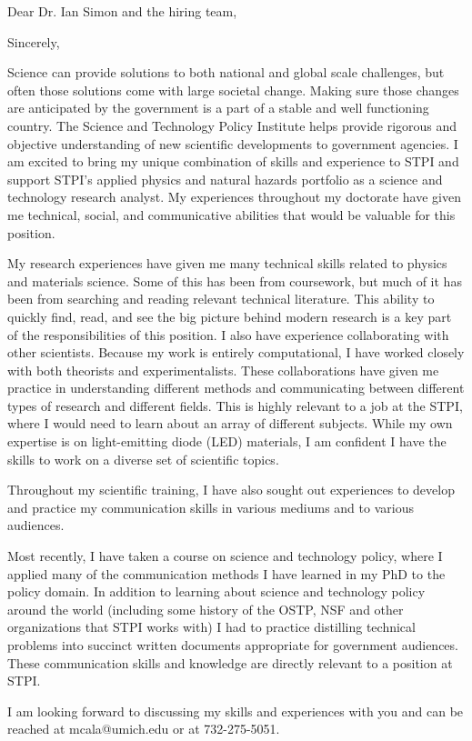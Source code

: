 \thispagestyle{empty}


\date{August 10, 2018}
\opening{Dear Dr. Ian Simon and the hiring team,}
\closing{Sincerely,}
\makelettertitle

Science can provide solutions to both national and global scale challenges, but often those solutions come with large societal change. Making sure those changes are anticipated by the government is a part of a stable and well functioning country. The Science and Technology Policy Institute helps provide rigorous and objective understanding of new scientific developments to government agencies. I am excited to bring my unique combination of skills and experience to STPI and support STPI's applied physics and natural hazards portfolio as a science and technology research analyst. My experiences throughout my doctorate have given me technical, social, and communicative abilities that would be valuable for this position.

My research experiences have given me many technical skills related to physics and materials science. Some of this has been from coursework, but much of it has been from searching and reading relevant technical literature. This ability to quickly find, read, and see the big picture behind modern research is a key part of the responsibilities of this position. I also have experience collaborating with other scientists. Because my work is entirely computational, I have worked closely with both theorists and experimentalists. These collaborations have given me practice in understanding different methods and communicating between different types of research and different fields. This is highly relevant to a job at the STPI, where I would need to learn about an array of different subjects. While my own expertise is on light-emitting diode (LED) materials, I am confident I have the skills to work on a diverse set of scientific topics.

Throughout my scientific training, I have also sought out experiences to develop and practice my communication skills in various mediums and to various audiences. 

Most recently, I have taken a course on science and technology policy, where I applied many of the communication methods I have learned in my PhD to the policy domain. In addition to learning about science and technology policy around the world (including some history of the OSTP, NSF and other organizations that STPI works with) I had to practice distilling technical problems into succinct written documents appropriate for government audiences. These communication skills and knowledge are directly relevant to a position at STPI.

I am looking forward to discussing my skills and experiences with you and can be reached at mcala@umich.edu or at 732-275-5051.

\makeletterclosing
